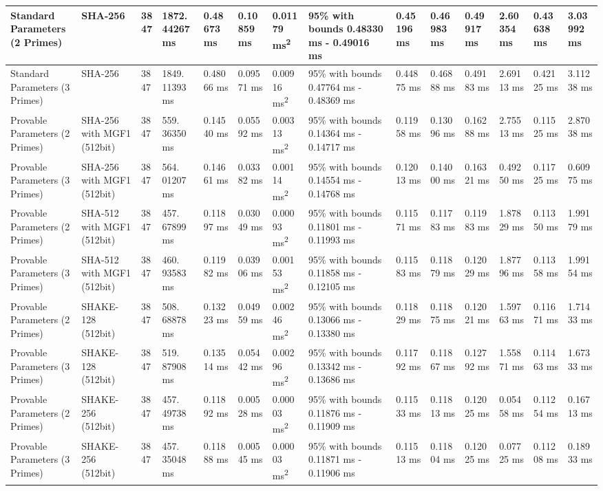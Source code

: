 \documentclass[]{final_report}
\theoremstyle{definition}
\begin{document}
\begin{landscape}
\begin{longtable}{|p{2.3cm}|p{1.8cm}|p{1.0cm}|p{1.7cm}|p{1.4cm}|p{1.5cm}|p{1.8cm}|p{1.5cm}|p{1.43cm}|p{1.5cm}|p{1.3cm}|p{1.4cm}|p{1.3cm}|p{1.3cm}|}
Standard Parameters (2 Primes) & SHA-256 & 3847 & 1872.
44267 ms & 0.48673 ms & 0.10859 ms & 0.01179 ms\textsuperscript{2} & 95\% with bounds 0.48330 ms - 0.49016 ms & 0.45196 ms & 0.46983 ms & 0.49917 ms & 2.60354 ms & 0.43638 ms & 3.03992 ms \\
\hline
Standard Parameters (3 Primes) & SHA-256 & 3847 & 1849.
11393 ms & 0.48066 ms & 0.09571 ms & 0.00916 ms\textsuperscript{2} & 95\% with bounds 0.47764 ms - 0.48369 ms & 0.44875 ms & 0.46888 ms & 0.49183 ms & 2.69113 ms & 0.42125 ms & 3.11238 ms \\
\hline
Provable Parameters (2 Primes) & SHA-256 with MGF1 (512bit) & 3847 & 559.
36350 ms & 0.14540 ms & 0.05592 ms & 0.00313 ms\textsuperscript{2} & 95\% with bounds 0.14364 ms - 0.14717 ms & 0.11958 ms & 0.13096 ms & 0.16288 ms & 2.75513 ms & 0.11525 ms & 2.87038 ms \\
\hline
Provable Parameters (3 Primes) & SHA-256 with MGF1 (512bit) & 3847 & 564.
01207 ms & 0.14661 ms & 0.03382 ms & 0.00114 ms\textsuperscript{2} & 95\% with bounds 0.14554 ms - 0.14768 ms & 0.12013 ms & 0.14000 ms & 0.16321 ms & 0.49250 ms & 0.11725 ms & 0.60975 ms \\
\hline
Provable Parameters (2 Primes) & SHA-512 with MGF1 (512bit) & 3847 & 457.
67899 ms & 0.11897 ms & 0.03049 ms & 0.00093 ms\textsuperscript{2} & 95\% with bounds 0.11801 ms - 0.11993 ms & 0.11571 ms & 0.11783 ms & 0.11983 ms & 1.87829 ms & 0.11350 ms & 1.99179 ms \\
\hline
Provable Parameters (3 Primes) & SHA-512 with MGF1 (512bit) & 3847 & 460.
93583 ms & 0.11982 ms & 0.03906 ms & 0.00153 ms\textsuperscript{2} & 95\% with bounds 0.11858 ms - 0.12105 ms & 0.11583 ms & 0.11879 ms & 0.12029 ms & 1.87796 ms & 0.11358 ms & 1.99154 ms \\
\hline
Provable Parameters (2 Primes) & SHAKE-128 (512bit) & 3847 & 508.
68878 ms & 0.13223 ms & 0.04959 ms & 0.00246 ms\textsuperscript{2} & 95\% with bounds 0.13066 ms - 0.13380 ms & 0.11829 ms & 0.11875 ms & 0.12021 ms & 1.59763 ms & 0.11671 ms & 1.71433 ms \\
\hline
Provable Parameters (3 Primes) & SHAKE-128 (512bit) & 3847 & 519.
87908 ms & 0.13514 ms & 0.05442 ms & 0.00296 ms\textsuperscript{2} & 95\% with bounds 0.13342 ms - 0.13686 ms & 0.11792 ms & 0.11867 ms & 0.12792 ms & 1.55871 ms & 0.11463 ms & 1.67333 ms \\
\hline
Provable Parameters (2 Primes) & SHAKE-256 (512bit) & 3847 & 457.
49738 ms & 0.11892 ms & 0.00528 ms & 0.00003 ms\textsuperscript{2} & 95\% with bounds 0.11876 ms - 0.11909 ms & 0.11533 ms & 0.11813 ms & 0.12025 ms & 0.05458 ms & 0.11254 ms & 0.16713 ms \\
\hline
Provable Parameters (3 Primes) & SHAKE-256 (512bit) & 3847 & 457.
35048 ms & 0.11888 ms & 0.00545 ms & 0.00003 ms\textsuperscript{2} & 95\% with bounds 0.11871 ms - 0.11906 ms & 0.11513 ms & 0.11804 ms & 0.12025 ms & 0.07725 ms & 0.11208 ms & 0.18933 ms \\
\hline


\end{longtable}
\end{landscape}
\end{document}

